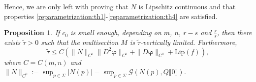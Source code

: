 \documentclass[a4paper,11pt,reqno]{amsart}
\newtheorem{proposition}[theorem]{Proposition}
\theoremstyle{definition}
\numberwithin{equation}{section}
\numberwithin{subsection}{section}
\newcommand{\G}{\mathcal{G}}
\newcommand{\Lip}{\mathrm{Lip}}
\newcommand{\bphi}{\boldsymbol{\varphi}}
\begin{document}
Hence, we are only left with proving that $N$ is Lipschitz continuous and that properties \eqref{reparametrization:th1}-\eqref{reparametrization:th4} are satisfied.

\begin{proposition} \label{vl:prop}
If $c_{0}$ is small enough, depending on $m$, $n$, $r - s$ and $\frac{r}{s}$, then there exists $\tilde{\tau} > 0$ such that the multisection $M$ is $\tilde{\tau}$-vertically limited. Furthermore,
\begin{equation} \label{vl:eq}
\tilde{\tau} \leq C \left( \|N\|_{C^{0}} \|D^{2}\bphi\|_{C^{0}} + \|D\bphi\|_{C^{0}} + \Lip(f) \right),
\end{equation}
where $C = C(m,n)$ and $\|N\|_{C^0} := \sup_{p \in \Sigma} |N(p)| = \sup_{p \in \Sigma} \G(N(p), Q \llbracket 0 \rrbracket)$.
\end{proposition}
\end{document}
